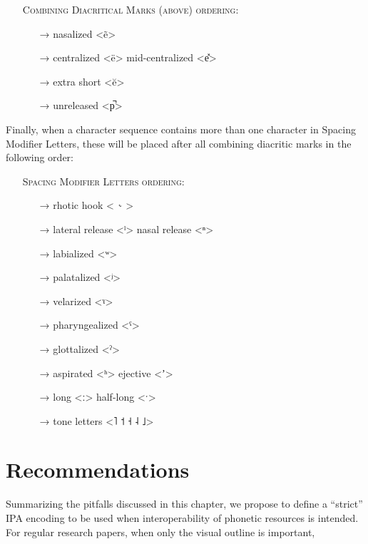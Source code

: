 \begin{itemize}
	\item[] \textsc{Combining Diacritical Marks (above) ordering:}
	\begin{itemize}
	  \item[→] nasalized <ẽ>
	  \item[→] centralized <ë> \textbar{} mid-centralized <e̽>
	  \item[→] extra short <ĕ>
	  \item[→] unreleased <p̚>
 \end{itemize} \end{itemize}

Finally, when a character sequence contains more than one character in Spacing
Modifier Letters, these will be placed after all combining diacritic marks in the
following order:

\begin{itemize}
	\item[] \textsc{Spacing Modifier Letters ordering:}
	\begin{itemize}
	  \item[→] rhotic hook <{\large \ ˞} >
	  \item[→] lateral release <ˡ> \textbar{} nasal release <ⁿ>
	  \item[→] labialized <ʷ>
	  \item[→] palatalized <ʲ>
	  \item[→] velarized <ˠ>
	  \item[→] pharyngealized <ˤ>
	  \item[→] glottalized <ˀ>
	  \item[→] aspirated <ʰ> \textbar{} ejective <ʼ>
	  \item[→] long <ː> \textbar{} half-long <ˑ>
	  \item[→] tone letters <˥ ˦ ˧ ˨ ˩>
	\end{itemize}
\end{itemize}

\section{Recommendations}
\label{ipa-recommendations}

Summarizing the pitfalls discussed in this chapter, we propose to define a 
``strict'' IPA encoding to be used when interoperability of phonetic resources 
is intended. For regular research papers, when only the visual outline is 
important, 

